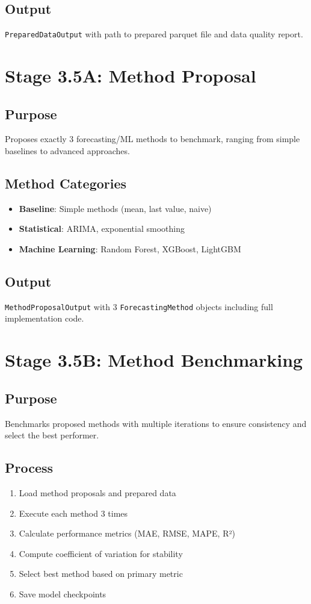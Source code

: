 \documentclass[12pt,a4paper]{report}
\begin{document}
\subsection{Output}
\texttt{PreparedDataOutput} with path to prepared parquet file and data quality report.

\section{Stage 3.5A: Method Proposal}
\subsection{Purpose}
Proposes exactly 3 forecasting/ML methods to benchmark, ranging from simple baselines to advanced approaches.

\subsection{Method Categories}
\begin{itemize}
    \item \textbf{Baseline}: Simple methods (mean, last value, naive)
    \item \textbf{Statistical}: ARIMA, exponential smoothing
    \item \textbf{Machine Learning}: Random Forest, XGBoost, LightGBM
\end{itemize}

\subsection{Output}
\texttt{MethodProposalOutput} with 3 \texttt{ForecastingMethod} objects including full implementation code.

\section{Stage 3.5B: Method Benchmarking}
\subsection{Purpose}
Benchmarks proposed methods with multiple iterations to ensure consistency and select the best performer.

\subsection{Process}
\begin{enumerate}
    \item Load method proposals and prepared data
    \item Execute each method 3 times
    \item Calculate performance metrics (MAE, RMSE, MAPE, R²)
    \item Compute coefficient of variation for stability
    \item Select best method based on primary metric
    \item Save model checkpoints
\end{enumerate}
\end{document}
